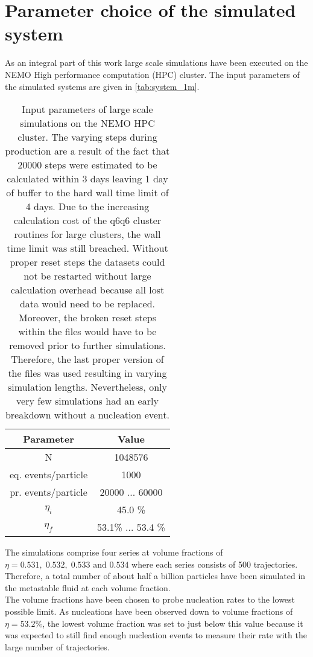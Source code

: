 
\label{chp:data_analysis}
\section{Parameter choice of the simulated system}
\label{sec:system_choice}
As an integral part of this work large scale simulations have been executed on the NEMO High performance computation (HPC) cluster. The input parameters of the simulated systems are given in \autoref{tab:system_1m}.

\begin{table}[h]
\centering
\begin{tabular}{c|c}
Parameter & Value \\ \hline
N & 1048576 \\
eq. events/particle & 1000 \\
pr. events/particle & 20000  ... 60000 \\
$\eta_i$ & 45.0 \% \\
$\eta_f$ & 53.1\% ... 53.4 \% \\
\end{tabular}
\caption[Simulation parameters of data production systems]{Input parameters of large scale simulations on the NEMO HPC cluster. The varying steps during production are a result of the fact that 20000 steps were estimated to be calculated within 3 days leaving 1 day of buffer to the hard wall time limit of 4 days. Due to the increasing calculation cost of the q6q6 cluster routines for large clusters, the wall time limit was still breached. Without proper reset steps the datasets could not be restarted without large calculation overhead because all lost data would need to be replaced. Moreover, the broken reset steps within the files would have to be removed prior to further simulations. Therefore, the last proper version of the files was used resulting in varying simulation lengths. Nevertheless, only very few simulations had an early breakdown without a nucleation event.}
\label{tab:system_1m}
\end{table}

The simulations comprise four series at volume fractions of $\eta = 0.531,\;0.532,\;0.533 \text{ and }0.534$ where each series consists of 500 trajectories. Therefore, a total number of about half a billion particles have been simulated in the metastable fluid at each volume fraction.\\

The volume fractions have been chosen to probe nucleation rates to the lowest possible limit. As nucleations have been observed down to volume fractions of $\eta=53.2\%$, the lowest volume fraction was set to just below this value because it was expected to still find enough nucleation events to measure their rate with the large number of trajectories.\\

